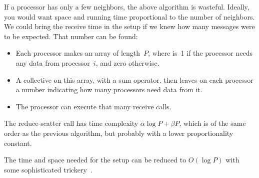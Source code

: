 If a processor has only a few neighbors, the above algorithm is wasteful. 
Ideally, you would want space and running time proportional to the number of neighbors.
We could bring the receive time in the setup if we knew how many messages
were to be expected. That number can be found:
\begin{itemize}
\item Each processor makes an array  of length~$P$, where 
  is~1 if the processor needs any data from processor~$i$, and zero otherwise.
\item A  collective on this array, with a
  sum operator, then leaves on each processor a number indicating how
  many processors need data from it.
\item The processor can execute that many receive calls.
\end{itemize}
The reduce-scatter call has time complexity $\alpha\log P+\beta P$,
which is of the same order as the previous algorithm, but 
probably with a lower proportionality constant.

The time and space needed for the setup can be reduced to $O(\log P)$ with some
sophisticated trickery~\cite{Falgout:scalable-hypre,Hoefler:2010:SCP}.


